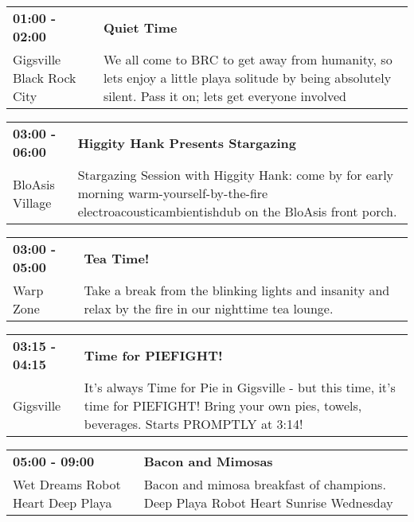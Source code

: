 \begin{tabular}{ p{1in} p{2.2in} }
    \textbf{01:00 - 02:00} & \textbf{Quiet Time} \\
    Gigsville \newline Black Rock City & We all come to BRC to get away from humanity, so lets enjoy a little playa solitude by being absolutely silent. Pass it on; lets get everyone involved \\
    \hline 
\end{tabular}
    
\begin{tabular}{ p{1in} p{2.2in} }
    \textbf{03:00 - 06:00} & \textbf{Higgity Hank Presents Stargazing} \\
    BloAsis Village \newline  & Stargazing Session with Higgity Hank: come by for early morning warm-yourself-by-the-fire electroacousticambientishdub on the BloAsis front porch. \\
    \hline 
\end{tabular}
    
\begin{tabular}{ p{1in} p{2.2in} }
    \textbf{03:00 - 05:00} & \textbf{Tea Time!} \\
    Warp Zone \newline  & Take a break from the blinking lights and insanity and relax by the fire in our nighttime tea lounge. \\
    \hline 
\end{tabular}
    
\begin{tabular}{ p{1in} p{2.2in} }
    \textbf{03:15 - 04:15} & \textbf{Time for PIEFIGHT!} \\
    Gigsville \newline  & It's always Time for Pie in Gigsville - but this time, it's time for PIEFIGHT! Bring your own pies, towels, beverages. Starts PROMPTLY at 3:14! \\
    \hline 
\end{tabular}
    
\begin{tabular}{ p{1in} p{2.2in} }
    \textbf{05:00 - 09:00} & \textbf{Bacon and Mimosas} \\
    Wet Dreams \newline Robot Heart Deep Playa & Bacon and mimosa breakfast of champions.  Deep Playa Robot Heart Sunrise Wednesday \\
    \hline 
\end{tabular}
    
